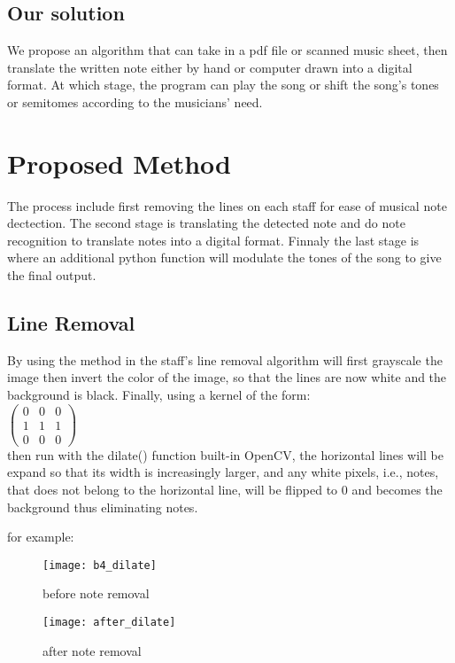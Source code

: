 \documentclass[a4paper,12pt]{report}
\begin{document}
\subsection{Our solution}
We propose an algorithm that can take in a pdf file or scanned music sheet, then 
translate the written note either by hand or computer drawn into a digital format.
At which stage, the program can play the song or shift the song's tones or semitomes 
according to the musicians' need.

\clearpage

\section{Proposed Method}
The process include first removing the lines on each staff for ease of musical
note dectection.  The second stage is translating the detected note and do note
recognition to translate notes into a digital format. Finnaly the last stage is
where an additional python function will modulate the tones of the song to give
the final output. 


\subsection{Line Removal}
By using the method in \textcite{Gomez2017} the staff's line removal algorithm
will first grayscale the image then invert the color of the image, so that the
lines are now white and the background is black. Finally, using a kernel of the
form: \\
$
\begin{pmatrix}
	0 & 0 & 0\\
	1 & 1 & 1\\
	0 & 0 & 0
\end{pmatrix}
$\\
then run with the dilate() function built-in OpenCV, the
horizontal lines will be expand so that its width is increasingly larger, and
any white pixels, i.e., notes, that does not belong to the horizontal line, will
be flipped to 0 and becomes the background thus eliminating notes.

for example:

\begin{figure}
    \centering
    \begin{minipage}{0.45\textwidth}
        \centering
        \texttt{[image: b4\_dilate]} %
        \caption{before note removal}
    \end{minipage}\hfill
    \begin{minipage}{0.45\textwidth}
        \centering
        \texttt{[image: after\_dilate]} %
        \caption{after note removal}
    \end{minipage}
\end{figure}

\printbibliography
\end{document}
